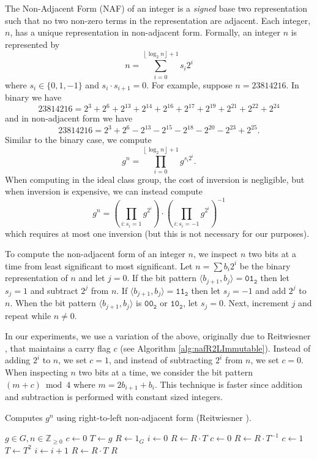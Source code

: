 \documentclass{ucalgthes1}
\theoremstyle{definition}
\newcommand{\ZZgez}{\mathbb{Z}_{\ge 0}}
\newcommand{\floor}[1]{\left\lfloor #1 \right\rfloor}
\newcommand{\binary}[1]{\texttt{#1}_\texttt{2}}
\begin{document}
The Non-Adjacent Form (NAF) of an integer is a \emph{signed} base two representation such that no two non-zero terms in the representation are adjacent. Each integer, $n$, has a unique representation in non-adjacent form. Formally, an integer $n$ is represented by
\[
	n = \sum_{i=0}^{\floor{\log_2 n}+1} s_i 2^i
\]
where $s_i \in \{0, 1, -1\}$ and $s_i \cdot s_{i+1} = 0$.  For example, suppose $n = 23814216$.  In binary we have
\begin{equation}
\label{eq:binaryEg}
	23814216 = 2^3+2^6+2^{13}+2^{14}+2^{16}+2^{17}+2^{19}+2^{21}+2^{22}+2^{24}
\end{equation}
and in non-adjacent form we have
\begin{equation}
\label{eq:nafEg}
	23814216 = 2^3+2^6-2^{13}-2^{15}-2^{18}-2^{20}-2^{23}+2^{25}.
\end{equation}
Similar to the binary case, we compute
\[
	g^n = \prod _{i=0}^{\floor{\log_2 n}+1} g^{s_i 2^i}.
\]
When computing in the ideal class group, the cost of inversion is negligible, but when inversion is expensive, we can instead compute
\[
	g^n = \left( \prod_{i : s_i=1} g^{2^i} \right) \cdot \left( \prod_{i : s_i=-1} g^{2^i} \right)^{-1}
\]
which requires at most one inversion (but this is not necessary for our purposes).

To compute the non-adjacent form of an integer $n$, we inspect $n$ two bits at a time from least significant to most significant.  Let $n=\sum b_i2^i$ be the binary representation of $n$ and let $j=0$.  If the bit pattern $\langle b_{j+1}, b_j \rangle = \binary{01}$ then let $s_j = 1$ and subtract $2^j$ from $n$.  If $\langle b_{j+1}, b_j \rangle = \binary{11}$ then let $s_j = -1$ and add $2^j$ to $n$.  When the bit pattern $\langle b_{j+1}, b_j \rangle$ is $\binary{00}$ or $\binary{10}$, let $s_j = 0$. Next, increment $j$ and repeat while $n \ne 0$.

In our experiments, we use a variation of the above, originally due to Reitwiesner \cite{reitwiesner1960}, that maintains a carry flag $c$ (see Algorithm \ref{alg:nafR2LImmutable}).  Instead of adding $2^i$ to $n$, we set $c = 1$, and instead of subtracting $2^i$ from $n$, we set $c = 0$.  When inspecting $n$ two bits at a time, we consider the bit pattern $(m+c) \bmod 4$ where $m = 2 b_{i+1} + b_i$.  This technique is faster since addition and subtraction is performed with constant sized integers.

\begin{algorithm}[h]
\caption{Computes $g^n$ using right-to-left non-adjacent form (Reitwiesner \cite{reitwiesner1960}).}
\label{alg:nafR2LImmutable}
\begin{algorithmic}[1]
\REQUIRE $g \in G, n \in \ZZgez$
\STATE $c \gets 0$ 
\STATE $T \gets g$ 
\STATE $R \gets 1_G$
\STATE $i \gets 0$
	\IF {$\floor{n/2^i}+c \equiv 1 \pmod 4$}
		\STATE $R \gets R \cdot T$
		\STATE $c \gets 0$
	\ELSIF {$\floor{n/2^i}+c \equiv 3 \pmod 4$}
		\STATE $R \gets R \cdot T^{-1}$
		\STATE $c \gets 1$
	\ENDIF
	\STATE $T \gets T^2$
	\STATE $i \gets i+1$
\ENDWHILE
{} \STATE $R \gets R \cdot T$ \ENDIF
\RETURN $R$
\end{algorithmic}
\end{algorithm}
\end{document}
